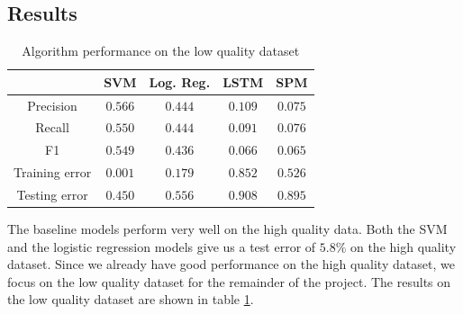 \documentclass[twocolumn]{article}
\begin{document}
\subsection{Results}
\begin{table}[b]
    \centering
    \caption{Algorithm performance on the low quality dataset}
        \begin{tabular}{|c|c|c|c|c|}
        \hline
         & SVM & Log. Reg. & LSTM & SPM\\\hline
        Precision & $0.566$ & $0.444$ & $0.109$ & $0.075$  \\
        Recall & $0.550$ & $0.444$ & $0.091$ & $0.076$ \\
        F1 & $0.549$ & $0.436$ & $0.066$ & $0.065$ \\ 
        Training error & $0.001$ & $0.179$ & $0.852$ & $0.526$ \\
        Testing error & $0.450$ & $0.556$ & $0.908$ & $0.895$ \\ \hline
        \end{tabular}
    \label{table:comparison}
\end{table}
The baseline models perform very well on the high quality data. Both the SVM and the logistic regression models give us a test error of $5.8\%$ on the high quality dataset. Since we already have good performance on the high quality dataset, we focus on the low quality dataset for the remainder of the project. The results on the low quality dataset are shown in table \ref{table:comparison}. 
\end{document}
